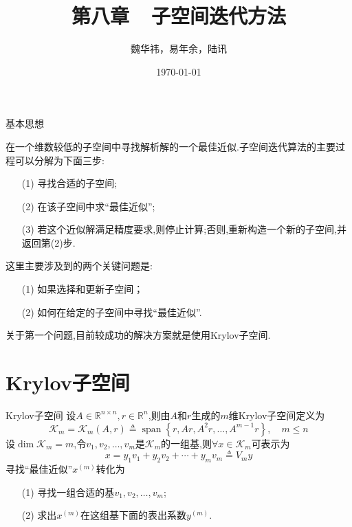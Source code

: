 \documentclass[notheorems,serif]{beamer}
\renewcommand{\normalsize}{\wuhao}
\newcommand{\wuhao}{\fontsize{10.5pt}{\baselineskip}\selectfont}
\begin{document}
\title[]{第八章~~子空间迭代方法}
\author[]{魏华祎，易年余，陆讯}
\date{\today}
\frame[plain]{\titlepage}


\begin{frame}{基本思想}

\normalsize
在一个{\color{blue}维数较低的子空间}中寻找解析解的一个{\color{blue}最佳近似}.子空间迭代算法的主要过程可以分解为下面三步:

\begin{itemize}
\item[(1)] 寻找合适的子空间;\\
	\item[(2)] 在该子空间中求“最佳近似”;\\
	\item[(3)] 若这个近似解满足精度要求,则停止计算;否则,重新构造一个新的子空间,并返回第(2)步.
\end{itemize}
	
这里主要涉及到的{\color{blue}两个关键问题}是:
\begin{itemize}
	\item[(1)] 如果选择和更新子空间；
	\item[(2)] 如何在给定的子空间中寻找“最佳近似”.
\end{itemize}
关于第一个问题,目前较成功的解决方案就是使用{\color{blue}Krylov子空间}.\\
\end{frame}

\section{Krylov子空间}
\begin{frame}
{Krylov子空间}
设$A \in \mathbb{R}^{n \times n}, r \in \mathbb{R}^{n}$,则由$A$和$r$生成的$m$维{\color{blue}Krylov子空间}定义为
$$
\boxed{\mathcal{K}_{m}=\mathcal{K}_{m}(A, r) \triangleq \operatorname{span}\left\{r, A r, A^{2} r, \ldots, A^{m-1} r\right\}, \quad m \leq n}
$$
设$\operatorname{dim} \mathcal{K}_{m}=m$,令$v_{1}, v_{2}, \ldots, v_{m}$是$\mathcal{K}_{m}$的一组基,则$\forall x \in \mathcal{K}_{m}$可表示为
$$x=y_{1} v_{1}+y_{2} v_{2}+\cdots+y_{m} v_{m} \triangleq V_{m} y$$
{\color{blue}寻找“最佳近似”$x^{(m)}$}转化为
\begin{itemize}
	\item[(1)] 寻找一组合适的基$v_{1}, v_{2}, \ldots, v_{m}$;
	\item[(2)] 求出$x^{(m)}$在这组基下面的表出系数$y^{(m)}$.
\end{itemize}
\end{frame}
\end{document}
